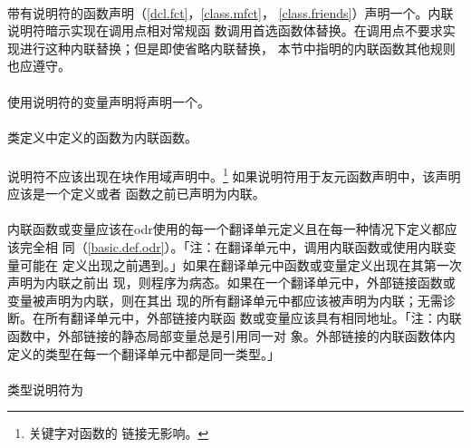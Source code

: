\paragraph{}
带有说明符的函数声明（\ref{dcl.fct}，\ref{class.mfct}，
\ref{class.friends}）声明一个。内联说明符暗示实现在调用点相对常规函
数调用首选函数体替换。在调用点不要求实现进行这种内联替换；但是即使省略内联替换，
本节中指明的内联函数其他规则也应遵守。

\paragraph{}
使用说明符的变量声明将声明一个。

\paragraph{}
类定义中定义的函数为内联函数。

\paragraph{}
说明符不应该出现在块作用域声明中。\footnote{关键字对函数的
链接无影响。} 如果说明符用于友元函数声明中，该声明应该是一个定义或者
函数之前已声明为内联。

\paragraph{}
内联函数或变量应该在odr使用的每一个翻译单元定义且在每一种情况下定义都应该完全相
同（\ref{basic.def.odr}）。「注：在翻译单元中，调用内联函数或使用内联变量可能在
定义出现之前遇到。」如果在翻译单元中函数或变量定义出现在其第一次声明为内联之前出
现，则程序为病态。如果在一个翻译单元中，外部链接函数或变量被声明为内联，则在其出
现的所有翻译单元中都应该被声明为内联；无需诊断。在所有翻译单元中，外部链接内联函
数或变量应该具有相同地址。「注：内联函数中，外部链接的静态局部变量总是引用同一对
象。外部链接的内联函数体内定义的类型在每一个翻译单元中都是同一类型。」

\paragraph{}
类型说明符为


